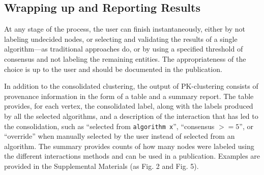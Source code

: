 


\subsection {Wrapping up and Reporting Results}

At any stage of the process, the user can finish instantaneously, either by not labeling undecided nodes, or selecting and validating the results of a single algorithm---as traditional approaches do, or by using a specified threshold of consensus and not labeling the remaining entities. The appropriateness of the choice is up to the user and should be documented in the publication.

In addition to the consolidated clustering, the output of PK-clustering consists of provenance information in the form of a table and a summary report.
The table provides, for each vertex, the consolidated label, along with the labels produced by all the selected algorithms, and a description of the interaction that has led to the consolidation, such as ``selected from \verb|algorithm x|'', ``consensus $>= 5$'', or ``override'' when manually selected by the user instead of selected from an algorithm.  The summary provides counts of how many nodes were labeled using the different interactions methods and can be used in a publication. Examples are provided in the Supplemental Materials (as Fig. 2 and Fig. 5). %

